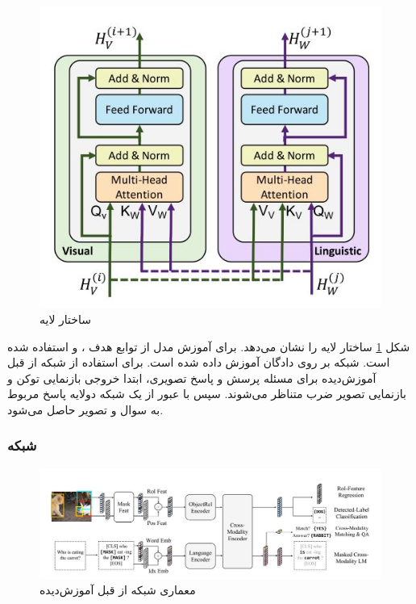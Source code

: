 	\begin{figure}
		\centerline{\includegraphics[scale=0.6]{images/coattentional.JPG}}
		\caption[ساختار لایه ]{ساختار لایه \cite{lu2019vilbert}}
		\label{fig:coattentional}
	\end{figure}
	شکل 
	\ref{fig:coattentional}
	ساختار لایه
	را نشان می‌دهد. برای آموزش مدل
	از توابع هدف
	،
	و 
	استفاده شده است. شبکه
	بر روی ‌دادگان
	آموزش داده شده است. برای استفاده از شبکه از قبل آموزش‌دیده
	برای مسئله پرسش و پاسخ تصویری، ابتدا خروجی بازنمایی توکن
	\lr{[CLS]}
	و بازنمایی تصویر ضرب متناظر می‌شوند. سپس با عبور از یک شبکه 
	دولایه پاسخ مربوط به سوال و تصویر حاصل می‌شود.

\subsubsection{شبکه }
	\begin{figure}
		\centerline{\includegraphics[scale=0.6]{images/LXMERT.JPG}}
		\caption[ معماری شبکه از قبل آموزش‌دیده ]{معماری شبکه از قبل آموزش‌دیده \cite{tan2019lxmert}}
		\label{fig:LXMERT}
	\end{figure}
	
